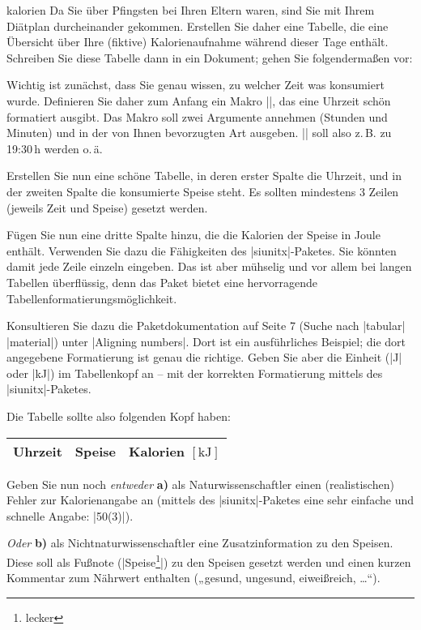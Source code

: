 \documentclass[
	blatt=6,
	ausgabe=24.\,05.\,2010,
	rückgabe=28.\,05.\,2010
]{lcourse-hd}
\begin{document}
\begin{exercise}[
  name={Pfingstkalorien},
  punkte=10,
  abgabe = Quellcode per Mail{,} Quellcode und fertiges Dokument (schwarz-weiß) ausgedruckt. Alle Angaben zu den Speisen sind natürlich freiwillig und dürfen fiktiv sein.]{kalorien}
Da Sie über Pfingsten bei Ihren Eltern waren, sind Sie mit Ihrem Diätplan durcheinander gekommen. Erstellen Sie daher eine Tabelle, die eine Übersicht über Ihre (fiktive) Kalorienaufnahme während dieser Tage enthält. Schreiben Sie diese Tabelle dann in ein Dokument; gehen Sie folgendermaßen vor:

Wichtig ist zunächst, dass Sie genau wissen, zu welcher Zeit was konsumiert wurde. Definieren Sie daher zum Anfang ein Makro |\zeit|, das eine Uhrzeit schön formatiert ausgibt. Das Makro soll zwei Argumente annehmen (Stunden und Minuten) und in der von Ihnen bevorzugten Art ausgeben. || soll also z.\,B. zu 19:30\,h werden o.\,ä.

Erstellen Sie nun eine schöne Tabelle, in deren erster Spalte die Uhrzeit, und in der zweiten Spalte die konsumierte Speise steht. Es sollten mindestens 3 Zeilen (jeweils Zeit und Speise) gesetzt werden.

Fügen Sie nun eine dritte Spalte hinzu, die die Kalorien der Speise in Joule enthält. Verwenden Sie dazu die Fähigkeiten des |siunitx|-Paketes. Sie könnten damit jede Zeile einzeln eingeben. Das ist aber mühselig und vor allem bei langen Tabellen überflüssig, denn das Paket bietet eine hervorragende Tabellenformatierungsmöglichkeit.

Konsultieren Sie dazu die Paketdokumentation auf Seite 7 (Suche nach |tabular| |material|) unter |Aligning numbers|. Dort ist ein ausführliches Beispiel; die dort angegebene Formatierung ist genau die richtige. Geben Sie aber die Einheit (|J| oder |kJ|) im Tabellenkopf an – mit der korrekten Formatierung mittels des |siunitx|-Paketes.

Die Tabelle sollte also folgenden Kopf haben:
\begin{table}[H]
\centering
\begin{tabular}{lll}
\toprule
Uhrzeit & Speise & Kalorien $[\mathrm{kJ}]$\\\midrule
\end{tabular}
\end{table}

Geben Sie nun noch \emph{entweder} \textbf{a)} als Naturwissenschaftler einen (realistischen) Fehler zur Kalorienangabe an (mittels des |siunitx|-Paketes eine sehr einfache und schnelle Angabe: |50(3)|).

\emph{Oder} \textbf{b)} als Nichtnaturwissenschaftler eine Zusatzinformation zu den Speisen. Diese soll als Fußnote (|Speise\footnote{lecker}|) zu den Speisen gesetzt werden und einen kurzen Kommentar zum Nährwert enthalten („gesund, ungesund, eiweißreich, …“).
\end{exercise}
\end{document}
